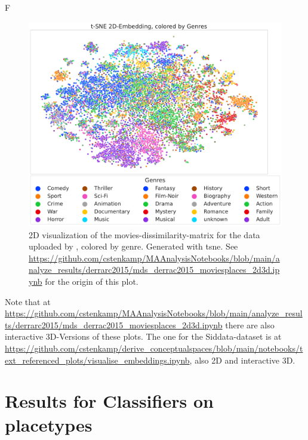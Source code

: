F
\begin{figure}[h]
	\begin{center}
	  \includegraphics[width=\textwidth]{graphics/figures/scatter_mds_tsne_movies_Genres.pdf}
	  \caption[2D visualization of the movies-dissimilarity-matrix.]{2D visualization of the movies-dissimilarity-matrix for the data uploaded by \textcite{Derrac2015}, colored by genre. Generated with \gls{tsne}. See \url{https://github.com/cstenkamp/MAAnalysisNotebooks/blob/main/analyze_results/derrarc2015/mds_derrac2015_moviesplaces_2d3d.ipynb} for the origin of this plot.}
	  \label{fig:scatter_mds_movies}
	\end{center}
\end{figure}

Note that at \url{https://github.com/cstenkamp/MAAnalysisNotebooks/blob/main/analyze_results/derrarc2015/mds_derrac2015_moviesplaces_2d3d.ipynb} there are also interactive 3D-Versions of these plots. The one for the Siddata-dataset is at \url{https://github.com/cstenkamp/derive_conceptualspaces/blob/main/notebooks/text_referenced_plots/visualise_embeddings.ipynb}, also 2D and interactive 3D. 

\clearpage
\section{Results for Classifiers on placetypes}

